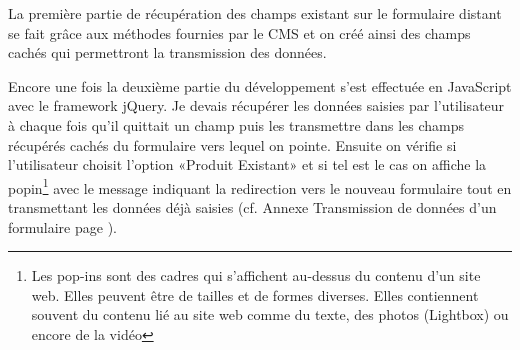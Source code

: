 \documentclass[a4paper,11pt,twoside]{report}
\begin{document}
      La première partie de récupération des champs existant sur le formulaire distant se fait grâce aux méthodes fournies par le CMS et on créé ainsi des champs cachés qui permettront la transmission des données. 
      \label{question_conditionnelle_1}
      
      Encore une fois la deuxième partie du développement s'est effectuée en JavaScript avec le framework jQuery. Je devais récupérer les données saisies par l'utilisateur à chaque fois qu'il quittait un champ puis les transmettre dans les champs récupérés cachés du formulaire vers lequel on pointe. Ensuite on vérifie si l'utilisateur choisit l'option «Produit Existant» et si tel est le cas on affiche la popin\footnote{Les pop-ins sont des cadres qui s'affichent au-dessus du contenu d'un site web. Elles peuvent être de tailles et de formes diverses. Elles contiennent souvent du contenu lié au site web comme du texte, des photos (Lightbox) ou encore de la vidéo} avec le message indiquant la redirection vers le nouveau formulaire tout en transmettant les données déjà saisies (cf. Annexe Transmission de données d'un formulaire page \pageref{transmission_de_donnees_d_un_formulaire}).
\end{document}

